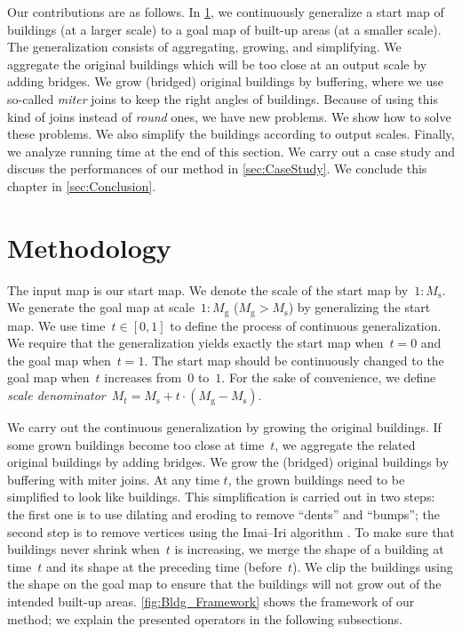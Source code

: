 Our contributions are as follows.
In \sect\ref{sec:Methodology},
we continuously generalize a start map of buildings
(at a larger scale) 
to a goal map of built-up areas (at a smaller scale).
The generalization consists of 
aggregating, growing, and simplifying.
We aggregate the original buildings which will be too close 
at an output scale by adding bridges.
We grow (bridged) original buildings by buffering,
where we use so-called \emph{miter} joins to keep the right 
angles of buildings.
Because of using this kind of joins 
instead of \emph{round} ones,
we have new problems.
We show how to solve these problems.
We also simplify the buildings according to output scales.
Finally, we analyze running time at the end of this section.
We carry out a case study 
and discuss the performances of our method in 
\sect\ref{sec:CaseStudy}.
We conclude this chapter in \sect\ref{sec:Conclusion}.

\section{Methodology}
\label{sec:Methodology}
The input map is our start map.
We denote the scale of the start map by~$1:M_\mathrm{s}$.
We generate the goal map at scale~$1:M_\mathrm{g}$ 
($M_\mathrm{g} > M_\mathrm{s}$) by generalizing the start map. 
We use time~$t\in[0,1]$ to define 
the process of continuous generalization. 
We require that 
the generalization yields exactly the start map when~$t=0$ 
and the goal map when~$t=1$.
The start map should be continuously changed to the goal map 
when~$t$ increases from~$0$ to~$1$.
For the sake of convenience, we define 
\emph{scale denominator}~$M_t= 
M_\mathrm{s} + t \cdot (M_\mathrm{g}-M_\mathrm{s})$.

We carry out the continuous generalization 
by growing the original buildings. 
If some grown buildings become too close at time~$t$,
we aggregate the related original buildings by adding bridges.
We grow the (bridged) original buildings 
by buffering with miter joins.
At any time $t$, the grown buildings 
need to be simplified to look like buildings.
This simplification is carried out in two steps:
the first one is to use dilating and eroding 
to remove ``dents'' and ``bumps''; 
the second step is to remove vertices 
using the Imai--Iri algorithm \citep{ImaiIri1988}.
To make sure that buildings never shrink 
when~$t$ is increasing,
we merge the shape of a building at time~$t$ 
and its shape at the preceding time (before~$t$). 
We clip the buildings using the shape on the goal map to 
ensure that the buildings will not 
grow out of the intended built-up areas.
\fig\ref{fig:Bldg_Framework} shows 
the framework of our method;
we explain the presented operators
in the following subsections.
 
